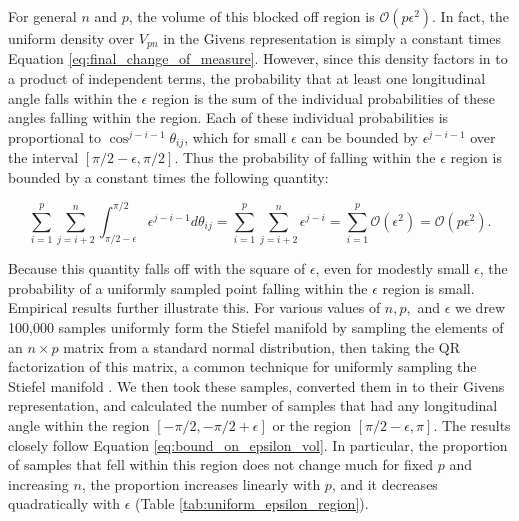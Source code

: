 \documentclass[ba]{imsart}
\numberwithin{equation}{section}
\theoremstyle{plain}
\begin{document}
\noindent For general $n$ and $p$, the volume of this blocked off region is $\mathcal{O}(p \epsilon^2)$. In fact, the uniform density over $V_{pn}$ in the Givens representation is simply a constant times Equation \ref{eq:final_change_of_measure}. However, since this density factors in to a product of independent terms, the probability that at least one longitudinal angle falls within the $\epsilon$ region is the sum of the individual probabilities of these angles falling within the region. Each of these individual probabilities is proportional to $\cos^{j-i-1} \theta_{ij}$, which for small $\epsilon$ can be bounded by $\epsilon^{j-i-1}$ over the interval $[\pi/2 - \epsilon, \pi/2]$. Thus the probability of falling within the $\epsilon$ region is bounded by a constant times the following quantity:

\begin{equation}
\label{eq:bound_on_epsilon_vol}
\sum_{i=1}^p \sum_{j=i+2}^n \int_{\pi/2-\epsilon}^{\pi/2} \epsilon^{j-i-1} d\theta_{ij} = \sum_{i=1}^p \sum_{j=i+2}^n \epsilon^{j-i} = \sum_{i=1}^p \mathcal{O}(\epsilon^2) = \mathcal{O}(p \epsilon^2).
\end{equation}

\noindent Because this quantity falls off with the square of $\epsilon$, even for modestly small $\epsilon$, the probability of a uniformly sampled point falling within the $\epsilon$ region is small. Empirical results further illustrate this. For various values of $n, p,$ and $\epsilon$ we drew 100,000 samples uniformly form the Stiefel manifold by sampling the elements of an $n \times p$ matrix from a standard normal distribution, then taking the QR factorization of this matrix, a common technique for uniformly sampling the Stiefel manifold \citep{muirhead2009aspects}. We then took these samples, converted them in to their Givens representation, and calculated the number of samples that had any longitudinal angle within the region $[-\pi/2, -\pi/2+\epsilon]$ or the region $[\pi/2-\epsilon, \pi]$. The results closely follow Equation \ref{eq:bound_on_epsilon_vol}. In particular, the proportion of samples that fell within this region does not change much for fixed $p$ and increasing $n$, the proportion increases linearly with $p$, and it decreases quadratically with $\epsilon$ (Table \ref{tab:uniform_epsilon_region}).  
\end{document}
